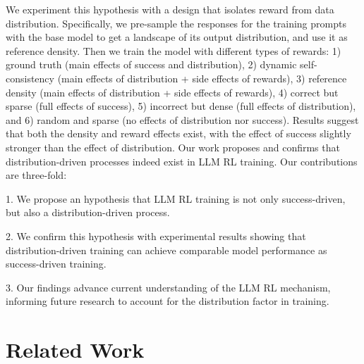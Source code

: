 \documentclass{article}
\begin{document}
We experiment this hypothesis with a design that isolates reward from data distribution. Specifically, we pre-sample the responses for the training prompts with the base model to get a landscape of its output distribution, and use it as reference density. Then we train the model with different types of rewards: 1) ground truth (main effects of success and distribution), 2) dynamic self-consistency (main effects of distribution + side effects of rewards), 3) reference density (main effects of distribution + side effects of rewards), 4) correct but sparse (full effects of success), 5) incorrect but dense (full effects of distribution), and 6) random and sparse (no effects of distribution nor success). Results suggest that both the density and reward effects exist, with the effect of success slightly stronger than the effect of distribution. Our work proposes and confirms that distribution-driven processes indeed exist in LLM RL training. Our contributions are three-fold:

1. We propose an hypothesis that LLM RL training is not only success-driven, but also a distribution-driven process.

2. We confirm this hypothesis with experimental results showing that distribution-driven training can achieve comparable model performance as success-driven training.

3. Our findings advance current understanding of the LLM RL mechanism, informing future research to account for the distribution factor in training.


\section{Related Work}
\end{document}
